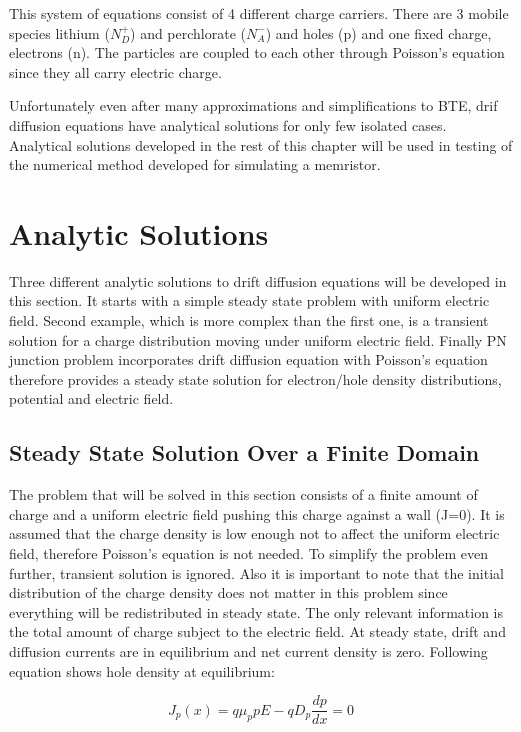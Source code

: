 \begin{doublespace}
This system of equations consist of 4 different charge carriers. There are 3 mobile species lithium ($N_{D}^{+}$) and perchlorate ($N_{A}^{-}$) and holes (p) and one fixed charge, electrons (n). The particles are coupled to each other through Poisson's equation since they all carry electric charge. 

Unfortunately even after many approximations and simplifications to BTE, drif diffusion equations have analytical solutions for only few isolated cases. Analytical solutions developed in the rest of this chapter will be used in testing of the numerical method developed for simulating a memristor. 

\clearpage
\section{Analytic Solutions}

Three different analytic solutions to drift diffusion equations will be developed in this section. It starts with a simple steady state problem with uniform electric field. Second example, which is more complex than the first one, is a  transient solution for a charge distribution moving under uniform electric field. Finally PN junction problem incorporates drift diffusion equation with Poisson's equation therefore provides a steady state solution for electron/hole density distributions, potential and electric field. 
  
\subsection{Steady State Solution Over a Finite Domain}

The problem that will be solved in this section consists of a finite amount of charge and a uniform electric field pushing this charge against a wall (J=0). It is assumed that the charge density is low enough not to affect the uniform electric field, therefore Poisson's equation is not needed. To simplify the problem even further, transient solution is ignored. Also it is important to note that the initial distribution of the charge density does not matter in this problem since everything will be redistributed in steady state. The only relevant information is the total amount of charge subject to the electric field. At steady state, drift and diffusion currents are in equilibrium and net current density is zero. Following equation shows hole density at equilibrium:

\begin{equation}
J_p(x)=q \mu_{p} p E-qD_{p} \frac{dp}{dx} =0
\end{equation}


\end{doublespace}
